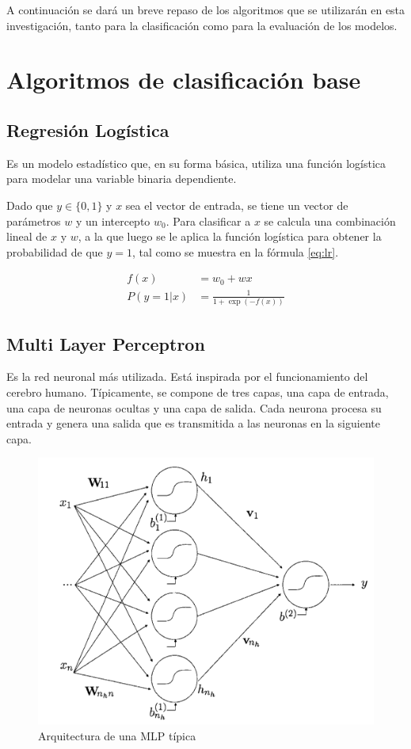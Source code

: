A continuación se dará un breve repaso de los algoritmos que se utilizarán en esta investigación, tanto para la clasificación como para la evaluación de los modelos.

\section{Algoritmos de clasificación base}

\subsection{Regresión Logística}

Es un modelo estadístico que, en su forma básica, utiliza una función logística para modelar una variable binaria dependiente.

Dado que $y\in \{0, 1\}$ y $x$ sea el vector de entrada, se tiene un vector de parámetros $w$ y un intercepto $w_0$. Para clasificar a $x$ se calcula una combinación lineal de $x$ y $w$, a la que luego se le aplica la función logística para obtener la probabilidad de que $y = 1$, tal como se muestra en la fórmula \ref{eq:lr}.

\begin{equation}
    \label{eq:lr}
\begin{split}
    f(x) &= w_0 + wx \\
    P(y=1|x) &= \frac{1}{1 + \exp(-f(x)) }
\end{split}
\end{equation}

\subsection{Multi Layer Perceptron}

Es la red neuronal más utilizada. Está inspirada por el funcionamiento del cerebro humano. Típicamente, se compone de tres capas, una capa de entrada, una capa de neuronas ocultas y una capa de salida. Cada neurona procesa su entrada y genera una salida que es transmitida a las neuronas en la siguiente capa.

\begin{figure}
    \centering
    \caption{Arquitectura de una MLP típica}
    \label{fig:mlp-eg}
    \includegraphics[width=0.6\linewidth]{graficos/mlp_eg.png}
\end{figure}

